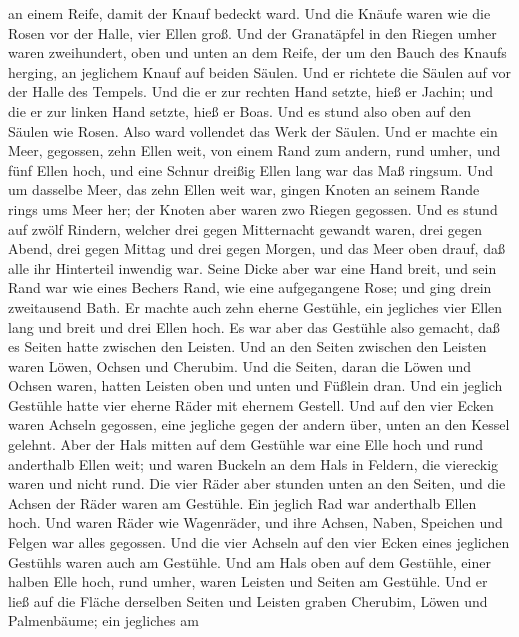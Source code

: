 an einem Reife, damit der Knauf bedeckt ward.  Und die
Knäufe waren wie die Rosen vor der Halle, vier Ellen groß. 
Und der Granatäpfel in den Riegen umher waren zweihundert, oben und
unten an dem Reife, der um den Bauch des Knaufs herging, an jeglichem
Knauf auf beiden Säulen.  Und er richtete die Säulen auf
vor der Halle des Tempels. Und die er zur rechten Hand setzte, hieß er
Jachin; und die er zur linken Hand setzte, hieß er Boas. 
Und es stund also oben auf den Säulen wie Rosen. Also ward vollendet das
Werk der Säulen.  Und er machte ein Meer, gegossen, zehn
Ellen weit, von einem Rand zum andern, rund umher, und fünf Ellen hoch,
und eine Schnur dreißig Ellen lang war das Maß ringsum. 
Und um dasselbe Meer, das zehn Ellen weit war, gingen Knoten an seinem
Rande rings ums Meer her; der Knoten aber waren zwo Riegen gegossen.
 Und es stund auf zwölf Rindern, welcher drei gegen
Mitternacht gewandt waren, drei gegen Abend, drei gegen Mittag und drei
gegen Morgen, und das Meer oben drauf, daß alle ihr Hinterteil inwendig
war.  Seine Dicke aber war eine Hand breit, und sein Rand
war wie eines Bechers Rand, wie eine aufgegangene Rose; und ging drein
zweitausend Bath.  Er machte auch zehn eherne Gestühle, ein
jegliches vier Ellen lang und breit und drei Ellen hoch. 
Es war aber das Gestühle also gemacht, daß es Seiten hatte zwischen den
Leisten.  Und an den Seiten zwischen den Leisten waren
Löwen, Ochsen und Cherubim. Und die Seiten, daran die Löwen und Ochsen
waren, hatten Leisten oben und unten und Füßlein dran.  Und
ein jeglich Gestühle hatte vier eherne Räder mit ehernem Gestell. Und
auf den vier Ecken waren Achseln gegossen, eine jegliche gegen der
andern über, unten an den Kessel gelehnt.  Aber der Hals
mitten auf dem Gestühle war eine Elle hoch und rund anderthalb Ellen
weit; und waren Buckeln an dem Hals in Feldern, die viereckig waren und
nicht rund.  Die vier Räder aber stunden unten an den
Seiten, und die Achsen der Räder waren am Gestühle. Ein jeglich Rad war
anderthalb Ellen hoch.  Und waren Räder wie Wagenräder, und
ihre Achsen, Naben, Speichen und Felgen war alles gegossen.
 Und die vier Achseln auf den vier Ecken eines jeglichen
Gestühls waren auch am Gestühle.  Und am Hals oben auf dem
Gestühle, einer halben Elle hoch, rund umher, waren Leisten und Seiten
am Gestühle.  Und er ließ auf die Fläche derselben Seiten
und Leisten graben Cherubim, Löwen und Palmenbäume; ein jegliches am
